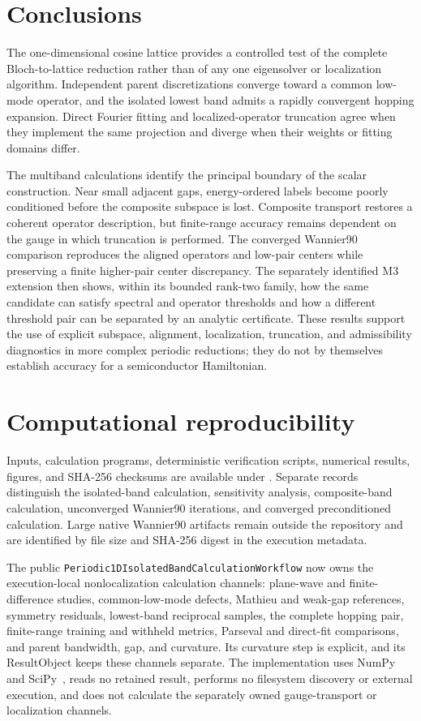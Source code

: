\section{Conclusions}

The one-dimensional cosine lattice provides a controlled test of the complete
Bloch-to-lattice reduction rather than of any one eigensolver or localization
algorithm. Independent parent discretizations converge toward a common
low-mode operator, and the isolated lowest band admits a rapidly convergent hopping
expansion. Direct Fourier fitting and localized-operator truncation agree when
they implement the same projection and diverge when their weights or fitting
domains differ.

The multiband calculations identify the principal boundary of the scalar
construction. Near small adjacent gaps, energy-ordered labels become poorly
conditioned before the composite subspace is lost. Composite transport restores
a coherent operator description, but finite-range accuracy remains dependent on
the gauge in which truncation is performed. The converged Wannier90 comparison
reproduces the aligned operators and low-pair centers while preserving a finite
higher-pair center discrepancy. The separately identified M3 extension then
shows, within its bounded rank-two family, how the same candidate can satisfy
spectral and operator thresholds and how a different threshold pair can be
separated by an analytic certificate. These results support the use of explicit
subspace, alignment, localization, truncation, and admissibility diagnostics in
more complex periodic reductions; they do not by themselves establish accuracy
for a semiconductor Hamiltonian.

\section{Computational reproducibility}

Inputs, calculation programs, deterministic verification scripts, numerical
results, figures, and SHA-256 checksums are available under
. Separate records distinguish
the isolated-band calculation, sensitivity analysis, composite-band
calculation, unconverged Wannier90 iterations, and converged preconditioned
calculation. Large native Wannier90 artifacts remain outside the repository and
are identified by file size and SHA-256 digest in the execution metadata.

The public
\texttt{Periodic1DIsolatedBandCalculationWorkflow} now owns the execution-local
nonlocalization calculation channels: plane-wave and finite-difference studies,
common-low-mode defects, Mathieu and weak-gap references, symmetry residuals,
lowest-band reciprocal samples, the complete hopping pair, finite-range training and
withheld metrics, Parseval and direct-fit comparisons, and parent bandwidth, gap, and
curvature. Its curvature step is explicit, and its ResultObject keeps these channels
separate. The implementation uses NumPy and SciPy~\cite{harris2020,virtanen2020}, reads
no retained result, performs no filesystem discovery or external execution, and does
not calculate the separately owned gauge-transport or localization channels.

